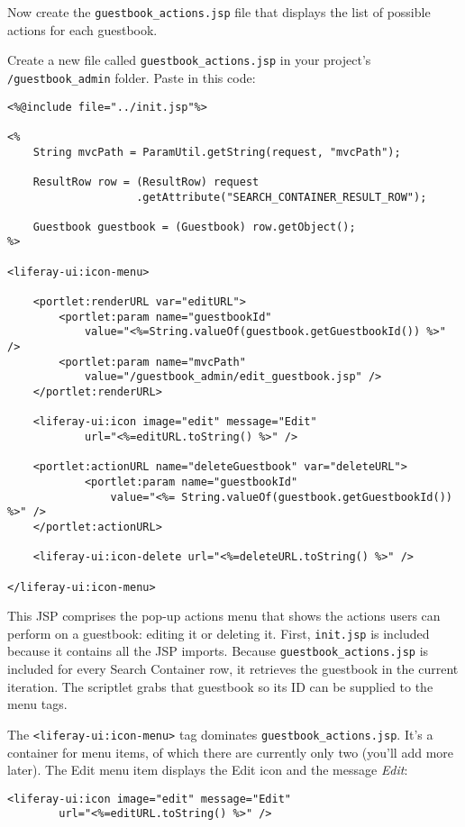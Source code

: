 Now create the \texttt{guestbook\_actions.jsp} file that displays the
list of possible actions for each guestbook.

Create a new file called \texttt{guestbook\_actions.jsp} in your
project's \texttt{/guestbook\_admin} folder. Paste in this code:

\begin{verbatim}
<%@include file="../init.jsp"%>

<%
    String mvcPath = ParamUtil.getString(request, "mvcPath");

    ResultRow row = (ResultRow) request
                    .getAttribute("SEARCH_CONTAINER_RESULT_ROW");

    Guestbook guestbook = (Guestbook) row.getObject();
%>

<liferay-ui:icon-menu>

    <portlet:renderURL var="editURL">
        <portlet:param name="guestbookId"
            value="<%=String.valueOf(guestbook.getGuestbookId()) %>" />
        <portlet:param name="mvcPath"
            value="/guestbook_admin/edit_guestbook.jsp" />
    </portlet:renderURL>

    <liferay-ui:icon image="edit" message="Edit"
            url="<%=editURL.toString() %>" />

    <portlet:actionURL name="deleteGuestbook" var="deleteURL">
            <portlet:param name="guestbookId"
                value="<%= String.valueOf(guestbook.getGuestbookId()) %>" />
    </portlet:actionURL>

    <liferay-ui:icon-delete url="<%=deleteURL.toString() %>" />

</liferay-ui:icon-menu>
\end{verbatim}

This JSP comprises the pop-up actions menu that shows the actions users
can perform on a guestbook: editing it or deleting it. First,
\texttt{init.jsp} is included because it contains all the JSP imports.
Because \texttt{guestbook\_actions.jsp} is included for every Search
Container row, it retrieves the guestbook in the current iteration. The
scriptlet grabs that guestbook so its ID can be supplied to the menu
tags.

The \texttt{\textless{}liferay-ui:icon-menu\textgreater{}} tag dominates
\texttt{guestbook\_actions.jsp}. It's a container for menu items, of
which there are currently only two (you'll add more later). The Edit
menu item displays the Edit icon and the message \emph{Edit}:

\begin{verbatim}
<liferay-ui:icon image="edit" message="Edit"
        url="<%=editURL.toString() %>" />
\end{verbatim}

